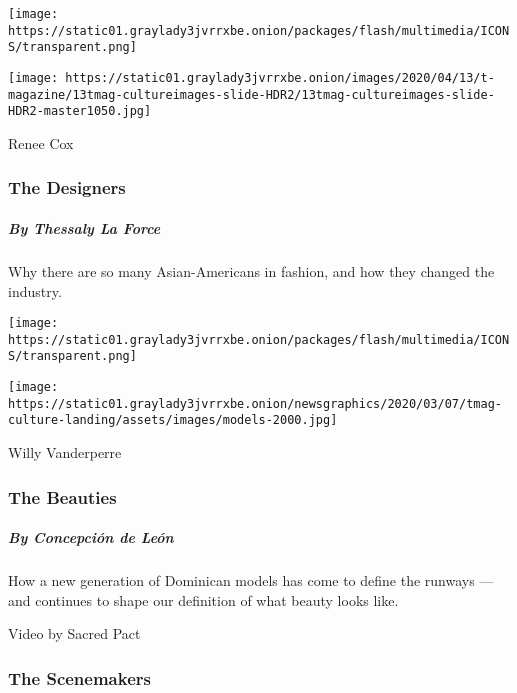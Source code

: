 \href{https://www.nytimes3xbfgragh.onion/interactive/2020/04/13/t-magazine/asian-american-fashion-designers.html}{}

\texttt{[image: https://static01.graylady3jvrrxbe.onion/packages/flash/multimedia/ICONS/transparent.png]}

\texttt{[image: https://static01.graylady3jvrrxbe.onion/images/2020/04/13/t-magazine/13tmag-cultureimages-slide-HDR2/13tmag-cultureimages-slide-HDR2-master1050.jpg]}

Renee Cox

\hypertarget{the-designers}{%
\subsubsection{The Designers}\label{the-designers}}

\hypertarget{by-thessaly-la-force}{%
\subparagraph{By Thessaly La Force}\label{by-thessaly-la-force}}

Why there are so many Asian-Americans in fashion, and how they changed
the industry.

\href{https://www.nytimes3xbfgragh.onion/interactive/2020/04/13/t-magazine/dominican-republic-models.html}{}

\texttt{[image: https://static01.graylady3jvrrxbe.onion/packages/flash/multimedia/ICONS/transparent.png]}

\texttt{[image: https://static01.graylady3jvrrxbe.onion/newsgraphics/2020/03/07/tmag-culture-landing/assets/images/models-2000.jpg]}

Willy Vanderperre

\hypertarget{the-beauties}{%
\subsubsection{The Beauties}\label{the-beauties}}

\hypertarget{by-concepcioux301n-de-leoux301n}{%
\subparagraph{By Concepción de
León}\label{by-concepcioux301n-de-leoux301n}}

How a new generation of Dominican models has come to define the runways
--- and continues to shape our definition of what beauty looks like.

\href{https://www.nytimes3xbfgragh.onion/interactive/2020/04/13/t-magazine/nyc-downtown-nightlife-party-scene.html}{}

Video by Sacred Pact

\hypertarget{the-scenemakers}{%
\subsubsection{The Scenemakers}\label{the-scenemakers}}

